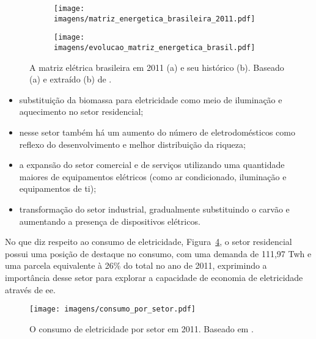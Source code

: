 \begin{figure}[h!t]
    \label{fig:eletricidade_brasil}
    \begin{center}
    \begin{subfigure}[c]{0.8\textwidth}
      \texttt{[image: imagens/matriz\_energetica\_brasileira\_2011.pdf]}
      \caption{}
      \label{fig:matriz_bra_2011}
    \end{subfigure}
    \hfill
    \begin{subfigure}[c]{0.8\textwidth}
      \texttt{[image: imagens/evolucao\_matriz\_energetica\_brasil.pdf]}
      \caption{}
      \label{fig:matriz_bra_evo}
    \end{subfigure}
  \end{center}
  \caption[Matriz energética brasileira.]{A matriz elétrica brasileira
em 2011 (a) e seu histórico (b). Baseado (a) e extraído (b) de \cite{ben2012}.}
\end{figure}

\begin{itemize}
\item substituição da biomassa para eletricidade como meio de iluminação
e aquecimento
no setor residencial;
\item nesse setor também há um aumento do número de eletrodomésticos como
reflexo do desenvolvimento e melhor distribuição da riqueza;
\item a expansão do setor comercial e de serviços utilizando uma quantidade
maiores de equipamentos elétricos (como ar condicionado, iluminação e equipamentos
de \acs{ti});
\item transformação do setor industrial, gradualmente substituindo o carvão e
aumentando a presença de dispositivos elétricos.
\end{itemize}

No que diz respeito ao consumo de eletricidade,
Figura~\ref{fig:eletricidade_por_setor},
o setor residencial possui uma posição de destaque no consumo, com uma demanda
de 111,97 T\acs{wh} e uma parcela equivalente à 26\% do total no ano de 2011,
exprimindo a importância desse setor para explorar a capacidade de economia de
eletricidade através de \gls{ee}.

\begin{figure}[h!t]
\centering
\texttt{[image: imagens/consumo\_por\_setor.pdf]}
\caption[Consumo de eletricidade por setor em 2011.]
{O consumo de eletricidade por setor em 2011. Baseado em \cite[pp. 32]{ben2012}.}
\label{fig:eletricidade_por_setor}
\end{figure}

